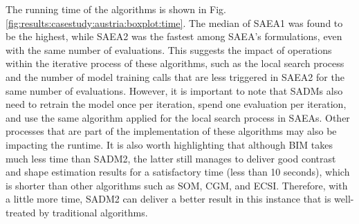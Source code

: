 			
			The running time of the algorithms is shown in Fig. \ref{fig:results:casestudy:austria:boxplot:time}. The median of SAEA1 was found to be the highest, while SAEA2 was the fastest among SAEA's formulations, even with the same number of evaluations. This suggests the impact of operations within the iterative process of these algorithms, such as the local search process and the number of model training calls that are less triggered in SAEA2 for the same number of evaluations. However, it is important to note that SADMs also need to retrain the model once per iteration, spend one evaluation per iteration, and use the same algorithm applied for the local search process in SAEAs. Other processes that are part of the implementation of these algorithms may also be impacting the runtime. It is also worth highlighting that although BIM takes much less time than SADM2, the latter still manages to deliver good contrast and shape estimation results for a satisfactory time (less than 10 seconds), which is shorter than other algorithms such as SOM, CGM, and ECSI. Therefore, with a little more time, SADM2 can deliver a better result in this instance that is well-treated by traditional algorithms.
		
